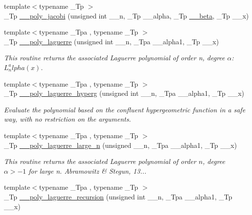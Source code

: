 \begin{DoxyCompactItemize}
{\footnotesize template$<$typename \+\_\+\+Tp $>$ }\\\+\_\+\+Tp \hyperlink{namespacestd_1_1____detail_a7fcc47c397903ac177380517e94153c6}{\+\_\+\+\_\+poly\+\_\+jacobi} (unsigned int \+\_\+\+\_\+n, \+\_\+\+Tp \+\_\+\+\_\+alpha, \+\_\+\+Tp \hyperlink{namespacestd_1_1____detail_a090d2f0920e0d208c467609b2a81d717}{\+\_\+\+\_\+beta}, \+\_\+\+Tp \+\_\+\+\_\+x)
\item 
{\footnotesize template$<$typename \+\_\+\+Tpa , typename \+\_\+\+Tp $>$ }\\\+\_\+\+Tp \hyperlink{namespacestd_1_1____detail_a76704115fd45b240802f4ccc433bb033}{\+\_\+\+\_\+poly\+\_\+laguerre} (unsigned int \+\_\+\+\_\+n, \+\_\+\+Tpa \+\_\+\+\_\+alpha1, \+\_\+\+Tp \+\_\+\+\_\+x)
\begin{DoxyCompactList}\small\item\em This routine returns the associated Laguerre polynomial of order n, degree $ \alpha $\+: $ L_n^alpha(x) $. \end{DoxyCompactList}\item 
{\footnotesize template$<$typename \+\_\+\+Tpa , typename \+\_\+\+Tp $>$ }\\\+\_\+\+Tp \hyperlink{namespacestd_1_1____detail_a1c817d7f5df1147829ad745176325cd6}{\+\_\+\+\_\+poly\+\_\+laguerre\+\_\+hyperg} (unsigned int \+\_\+\+\_\+n, \+\_\+\+Tpa \+\_\+\+\_\+alpha1, \+\_\+\+Tp \+\_\+\+\_\+x)
\begin{DoxyCompactList}\small\item\em Evaluate the polynomial based on the confluent hypergeometric function in a safe way, with no restriction on the arguments. \end{DoxyCompactList}\item 
{\footnotesize template$<$typename \+\_\+\+Tpa , typename \+\_\+\+Tp $>$ }\\\+\_\+\+Tp \hyperlink{namespacestd_1_1____detail_a1f9e78deb2bcc73511c77dcb1cdcf4c8}{\+\_\+\+\_\+poly\+\_\+laguerre\+\_\+large\+\_\+n} (unsigned \+\_\+\+\_\+n, \+\_\+\+Tpa \+\_\+\+\_\+alpha1, \+\_\+\+Tp \+\_\+\+\_\+x)
\begin{DoxyCompactList}\small\item\em This routine returns the associated Laguerre polynomial of order $ n $, degree $ \alpha > -1 $ for large n. Abramowitz \& Stegun, 13... \end{DoxyCompactList}\item 
{\footnotesize template$<$typename \+\_\+\+Tpa , typename \+\_\+\+Tp $>$ }\\\+\_\+\+Tp \hyperlink{namespacestd_1_1____detail_a6d3a7499bd109d5c0ea01e85f3165730}{\+\_\+\+\_\+poly\+\_\+laguerre\+\_\+recursion} (unsigned int \+\_\+\+\_\+n, \+\_\+\+Tpa \+\_\+\+\_\+alpha1, \+\_\+\+Tp \+\_\+\+\_\+x)

\end{DoxyCompactItemize}
